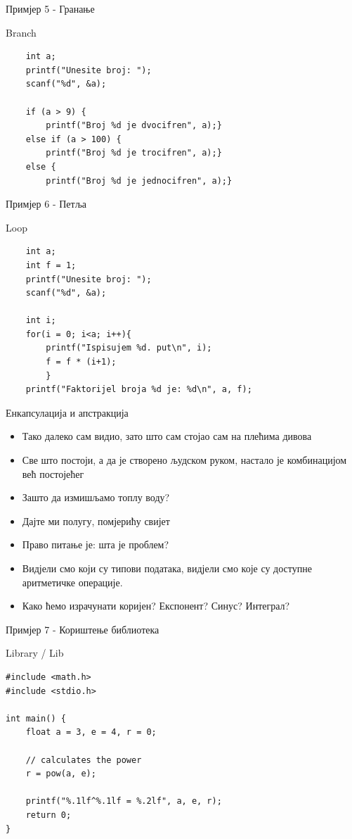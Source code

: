 \documentclass{beamer}
\begin{document}
\begin{frame}[fragile]{Примјер 5 - Гранање}
\begin{block}{Branch}
\begin{lstlisting}
    int a;
    printf("Unesite broj: ");
    scanf("%d", &a);  
    
    if (a > 9) {
        printf("Broj %d je dvocifren", a);}
    else if (a > 100) {
        printf("Broj %d je trocifren", a);}
    else {
        printf("Broj %d je jednocifren", a);}
\end{lstlisting}
\end{block}
\end{frame}

\begin{frame}[fragile]{Примјер 6 - Петља}
\begin{block}{Loop}
\begin{lstlisting}
    int a;
    int f = 1;
    printf("Unesite broj: ");
    scanf("%d", &a);  
    
    int i;
    for(i = 0; i<a; i++){
        printf("Ispisujem %d. put\n", i);
        f = f * (i+1);
        }
    printf("Faktorijel broja %d je: %d\n", a, f);
\end{lstlisting}
\end{block}
\end{frame}

\begin{frame}{Енкапсулација и апстракција}
\begin{itemize}
    \item Тако далеко сам видио, зато што сам стојао сам на плећима дивова
    \item Све што постоји, а да је створено људском руком, настало је комбинацијом већ постојећег
    \item Зашто да измишљамо топлу воду?
    \item Дајте ми полугу, помјерићу свијет
    \item Право питање је: шта је проблем?
    \item Видјели смо који су типови података, видјели смо које су доступне аритметичке операције.
    \item Како ћемо израчунати коријен? Експонент? Синус? Интеграл?
\end{itemize}
\end{frame}

\begin{frame}[fragile]{Примјер 7 - Кориштење библиотека}
\begin{block}{Library / Lib}
\begin{lstlisting}
#include <math.h>
#include <stdio.h>

int main() {
    float a = 3, e = 4, r = 0;

    // calculates the power
    r = pow(a, e);

    printf("%.1lf^%.1lf = %.2lf", a, e, r);
    return 0;
}
\end{lstlisting}
\end{block}
\end{frame}
\end{document}
